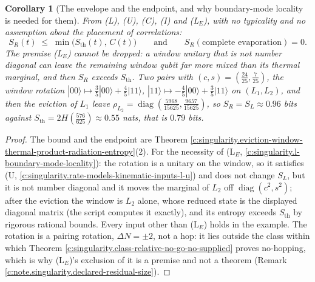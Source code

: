 \documentclass[11pt]{article}
\newtheorem{corollary}[theorem]{Corollary}
\theoremstyle{definition}
\theoremstyle{plain}
\providecommand{\Sth}{}\renewcommand{\Sth}{S_{\mathrm{th}}}
\begin{document}
\begin{corollary}[The envelope and the endpoint, and why boundary-mode locality is needed for them]\label{c:singularity.envelope-endpoint-why-boundary-mode-locality}
From (L), (U), (C), (I) and (L$_E$), with no typicality and no assumption about the placement of correlations:
\[
S_R(t) \;\leq\; \min\bigl(\Sth(t),\, C(t)\bigr) \qquad \text{and} \qquad S_R(\text{complete evaporation}) = 0 .
\]
The premise (L$_E$) cannot be dropped: a window unitary that is not number diagonal can leave the remaining window qubit far more mixed than its thermal marginal, and then $S_R$ exceeds $\Sth$. Two pairs with $(c, s) = (\tfrac{24}{25}, \tfrac{7}{25})$, the window rotation $|00\rangle \mapsto \tfrac35|00\rangle + \tfrac45|11\rangle$, $|11\rangle \mapsto -\tfrac45|00\rangle + \tfrac35|11\rangle$ on $(L_1, L_2)$, and then the eviction of $L_1$ leave $\rho_{L_2} = \operatorname{diag}(\tfrac{5968}{15625}, \tfrac{9657}{15625})$, so $S_R = S_L \approx 0.96$ bits against $\Sth = 2H(\tfrac{576}{625}) \approx 0.55$ nats, that is $0.79$ bits.
\end{corollary}
\begin{proof}
The bound and the endpoint are Theorem \ref{c:singularity.eviction-window-thermal-product-radiation-entropy}(2). For the necessity of (L$_E$, \ref{c:singularity.l-boundary-mode-locality}): the rotation is a unitary on the window, so it satisfies (U, \ref{c:singularity.rate-models-kinematic-inputs-l-u}) and does not change $S_L$, but it is not number diagonal and it moves the marginal of $L_2$ off $\operatorname{diag}(c^{2}, s^{2})$; after the eviction the window is $L_2$ alone, whose reduced state is the displayed diagonal matrix (the script computes it exactly), and its entropy exceeds $\Sth$ by rigorous rational bounds. Every input other than (L$_E$) holds in the example. The rotation is a pairing rotation, $\Delta N = \pm 2$, not a hop: it lies outside the class within which Theorem \ref{c:singularity.class-relative-no-go-no-supplied} proves no-hopping, which is why (L$_E$)'s exclusion of it is a premise and not a theorem (Remark \ref{c:note.singularity.declared-residual-size}).

\end{proof}
\end{document}
